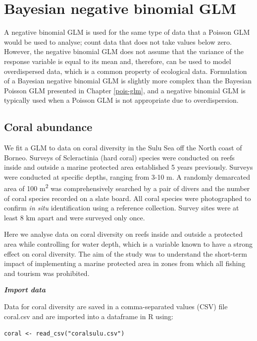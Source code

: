 \documentclass[
]{book}
\begin{document}
\hypertarget{nb-glm}{%
\chapter{Bayesian negative binomial GLM}\label{nb-glm}}

A negative binomial GLM is used for the same type of data that a Poisson GLM would be used to analyse; count data that does not take values below zero. However, the negative binomial GLM does not assume that the variance of the response variable is equal to its mean and, therefore, can be used to model overdispersed data, which is a common property of ecological data. Formulation of a Bayesian negative binomial GLM is slightly more complex than the Bayesian Poisson GLM presented in Chapter \ref{pois-glm}, and a negative binomial GLM is typically used when a Poisson GLM is not appropriate due to overdispersion.

\hypertarget{coral-abundance}{%
\section{Coral abundance}\label{coral-abundance}}

We fit a GLM to data on coral diversity in the Sulu Sea off the North coast of Borneo. Surveys of Scleractinia (hard coral) species were conducted on reefs inside and outside a marine protected area established 5 years previously. Surveys were conducted at specific depths, ranging from 3-10 m. A randomly demarcated area of 100 m\textsuperscript{2} was comprehensively searched by a pair of divers and the number of coral species recorded on a slate board. All coral species were photographed to confirm \emph{in situ} identification using a reference collection. Survey sites were at least 8 km apart and were surveyed only once.

Here we analyse data on coral diversity on reefs inside and outside a protected area while controlling for water depth, which is a variable known to have a strong effect on coral diversity. The aim of the study was to understand the short-term impact of implementing a marine protected area in zones from which all fishing and tourism was prohibited.

\emph{\textbf{Import data}}

Data for coral diversity are saved in a comma-separated values (CSV) file coral.csv and are imported into a dataframe in R using:

\texttt{coral\ \textless{}-\ read\_csv("coralsulu.csv")}
\end{document}
